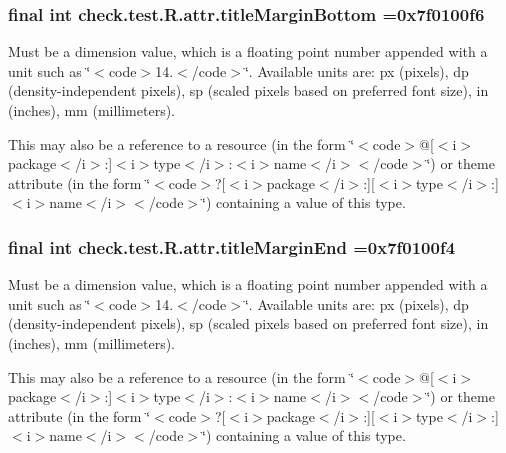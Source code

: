 \subsubsection[{title\+Margin\+Bottom}]{\setlength{\rightskip}{0pt plus 5cm}final int check.\+test.\+R.\+attr.\+title\+Margin\+Bottom =0x7f0100f6\hspace{0.3cm}{\ttfamily [static]}}\label{classcheck_1_1test_1_1_r_1_1attr_af0ece8636a362c616b298368dbfd014f}
Must be a dimension value, which is a floating point number appended with a unit such as \char`\"{}$<$code$>$14.\+5sp$<$/code$>$\char`\"{}. Available units are\+: px (pixels), dp (density-\/independent pixels), sp (scaled pixels based on preferred font size), in (inches), mm (millimeters). 

This may also be a reference to a resource (in the form \char`\"{}$<$code$>$@\mbox{[}$<$i$>$package$<$/i$>$\+:\mbox{]}$<$i$>$type$<$/i$>$\+:$<$i$>$name$<$/i$>$$<$/code$>$\char`\"{}) or theme attribute (in the form \char`\"{}$<$code$>$?\mbox{[}$<$i$>$package$<$/i$>$\+:\mbox{]}\mbox{[}$<$i$>$type$<$/i$>$\+:\mbox{]}$<$i$>$name$<$/i$>$$<$/code$>$\char`\"{}) containing a value of this type. \hypertarget{classcheck_1_1test_1_1_r_1_1attr_ab9d5799591281efe884d17139689b1a0}{}
\subsubsection[{title\+Margin\+End}]{\setlength{\rightskip}{0pt plus 5cm}final int check.\+test.\+R.\+attr.\+title\+Margin\+End =0x7f0100f4\hspace{0.3cm}{\ttfamily [static]}}\label{classcheck_1_1test_1_1_r_1_1attr_ab9d5799591281efe884d17139689b1a0}
Must be a dimension value, which is a floating point number appended with a unit such as \char`\"{}$<$code$>$14.\+5sp$<$/code$>$\char`\"{}. Available units are\+: px (pixels), dp (density-\/independent pixels), sp (scaled pixels based on preferred font size), in (inches), mm (millimeters). 

This may also be a reference to a resource (in the form \char`\"{}$<$code$>$@\mbox{[}$<$i$>$package$<$/i$>$\+:\mbox{]}$<$i$>$type$<$/i$>$\+:$<$i$>$name$<$/i$>$$<$/code$>$\char`\"{}) or theme attribute (in the form \char`\"{}$<$code$>$?\mbox{[}$<$i$>$package$<$/i$>$\+:\mbox{]}\mbox{[}$<$i$>$type$<$/i$>$\+:\mbox{]}$<$i$>$name$<$/i$>$$<$/code$>$\char`\"{}) containing a value of this type. \hypertarget{classcheck_1_1test_1_1_r_1_1attr_a088a77fc6e1f7916d5c036ebebe5ab5c}{}
